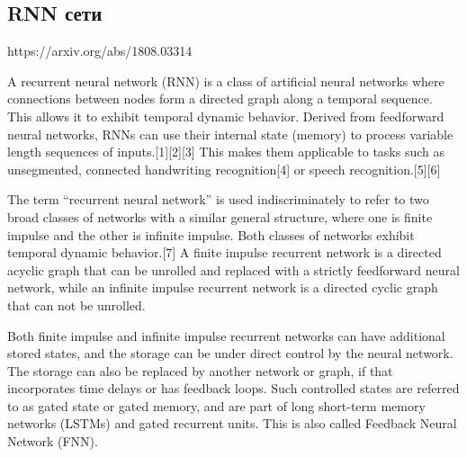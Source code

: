 \subsection{RNN сети}
{\color{red}
https://arxiv.org/abs/1808.03314
	
A recurrent neural network (RNN) is a class of artificial neural networks where connections between nodes form a directed graph along a temporal sequence. This allows it to exhibit temporal dynamic behavior. Derived from feedforward neural networks, RNNs can use their internal state (memory) to process variable length sequences of inputs.[1][2][3] This makes them applicable to tasks such as unsegmented, connected handwriting recognition[4] or speech recognition.[5][6]

The term “recurrent neural network” is used indiscriminately to refer to two broad classes of networks with a similar general structure, where one is finite impulse and the other is infinite impulse. Both classes of networks exhibit temporal dynamic behavior.[7] A finite impulse recurrent network is a directed acyclic graph that can be unrolled and replaced with a strictly feedforward neural network, while an infinite impulse recurrent network is a directed cyclic graph that can not be unrolled.

Both finite impulse and infinite impulse recurrent networks can have additional stored states, and the storage can be under direct control by the neural network. The storage can also be replaced by another network or graph, if that incorporates time delays or has feedback loops. Such controlled states are referred to as gated state or gated memory, and are part of long short-term memory networks (LSTMs) and gated recurrent units. This is also called Feedback Neural Network (FNN).

}
